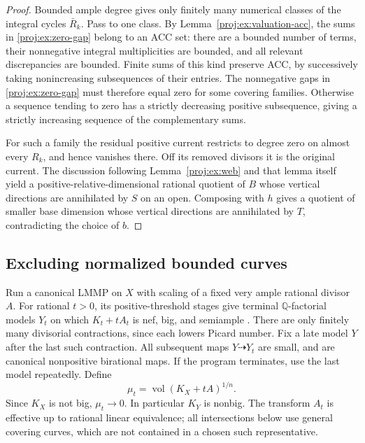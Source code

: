 \documentclass[11pt,letterpaper]{article}
\newcommand{\Q}{\mathbb{Q}}
\DeclareMathOperator{\vol}{vol}
\theoremstyle{definition}
\theoremstyle{remark}
\begin{document}
\begin{proof}
Bounded ample degree gives only finitely many numerical
classes of the integral cycles \(\bar R_k\). Pass to one
class. By Lemma~\ref{proj:ex:valuation-acc}, the sums in
\eqref{proj:ex:zero-gap} belong to an ACC set: there are a bounded
number of terms, their nonnegative integral multiplicities
are bounded, and all relevant discrepancies are bounded.
Finite sums of this kind preserve ACC, by successively
taking nonincreasing subsequences of their entries.
The nonnegative gaps in \eqref{proj:ex:zero-gap} must therefore
equal zero for some covering families. Otherwise a sequence
tending to zero has a strictly decreasing positive
subsequence, giving a strictly increasing sequence of the
complementary sums.

For such a family the residual positive current restricts
to degree zero on almost every \(R_k\), and hence vanishes
there. Off its removed divisors it is the original current.
The discussion following Lemma~\ref{proj:ex:web} and that lemma
itself yield a positive-relative-dimensional rational
quotient of \(B\) whose vertical directions are annihilated
by \(S\) on an open. Composing with \(h\) gives a quotient
of smaller base dimension whose vertical directions are
annihilated by \(T\), contradicting the choice of \(b\).
\end{proof}

\subsection{Excluding normalized bounded curves}

Run a canonical LMMP on \(X\) with scaling of a fixed very ample
rational divisor \(A\). For rational \(t>0\), its positive-threshold
stages give terminal \(\Q\)-factorial models \(Y_t\) on which
\(K_t+tA_t\) is nef, big, and semiample
\cite{BCHM}. There are only finitely many divisorial
contractions, since each lowers Picard number. Fix a late model
\(Y\) after the last such contraction. All subsequent maps
\(Y\dashrightarrow Y_t\) are small, and are canonical
nonpositive birational maps. If the program terminates, use
the last model repeatedly. Define
\begin{equation}\label{proj:ex:volume-scale}
 \mu_t=\vol(K_X+tA)^{1/n}.
\end{equation}
Since \(K_X\) is not big, \(\mu_t\to0\). In particular \(K_Y\)
is nonbig. The transform \(A_t\) is effective up to rational
linear equivalence; all intersections below use general
covering curves, which are not contained in a chosen such
representative.
\end{document}
